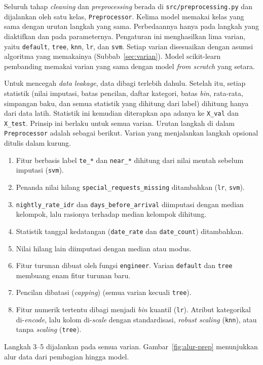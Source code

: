 Seluruh tahap \textit{cleaning} dan \textit{preprocessing} berada di
\texttt{src/preprocessing.py} dan dijalankan oleh satu kelas,
\texttt{Preprocessor}. Kelima model memakai kelas yang sama dengan urutan
langkah yang sama. Perbedaannya hanya pada langkah yang diaktifkan dan pada
parameternya. Pengaturan ini menghasilkan lima varian, yaitu \texttt{default},
\texttt{tree}, \texttt{knn}, \texttt{lr}, dan \texttt{svm}. Setiap varian
disesuaikan dengan asumsi algoritma yang memakainya (Subbab~\ref{sec:varian}).
Model scikit-learn pembanding memakai varian yang sama dengan model
\textit{from scratch} yang setara.

Untuk mencegah \textit{data leakage}, data dibagi terlebih dahulu. Setelah itu,
setiap statistik (nilai imputasi, batas pencilan, daftar kategori, batas
\textit{bin}, rata-rata, simpangan baku, dan semua statistik yang dihitung dari
label) dihitung hanya dari data latih. Statistik ini kemudian diterapkan apa
adanya ke \texttt{X\_val} dan \texttt{X\_test}. Prinsip ini berlaku untuk semua
varian. Urutan langkah di dalam \texttt{Preprocessor} adalah sebagai berikut.
Varian yang menjalankan langkah opsional ditulis dalam kurung.
\begin{enumerate}
	\item Fitur berbasis label \texttt{te\_*} dan \texttt{near\_*} dihitung dari
	nilai mentah sebelum imputasi (\texttt{svm}).
	\item Penanda nilai hilang \texttt{special\_requests\_missing} ditambahkan
	(\texttt{lr}, \texttt{svm}).
	\item \texttt{nightly\_rate\_idr} dan \texttt{days\_before\_arrival} diimputasi
	dengan median kelompok, lalu rasionya terhadap median kelompok dihitung.
	\item Statistik tanggal kedatangan (\texttt{date\_rate} dan
	\texttt{date\_count}) ditambahkan.
	\item Nilai hilang lain diimputasi dengan median atau modus.
	\item Fitur turunan dibuat oleh fungsi \texttt{engineer}. Varian
	\texttt{default} dan \texttt{tree} membuang enam fitur turunan baru.
	\item Pencilan dibatasi (\textit{capping}) (semua varian kecuali \texttt{tree}).
	\item Fitur numerik tertentu dibagi menjadi \textit{bin} kuantil (\texttt{lr}).
	Atribut kategorikal di-\textit{encode}, lalu kolom di-\textit{scale} dengan
	standardisasi, \textit{robust scaling} (\texttt{knn}), atau tanpa
	\textit{scaling} (\texttt{tree}).
\end{enumerate}
Langkah 3--5 dijalankan pada semua varian. Gambar~\ref{fig:alur-prep}
menunjukkan alur data dari pembagian hingga model.

